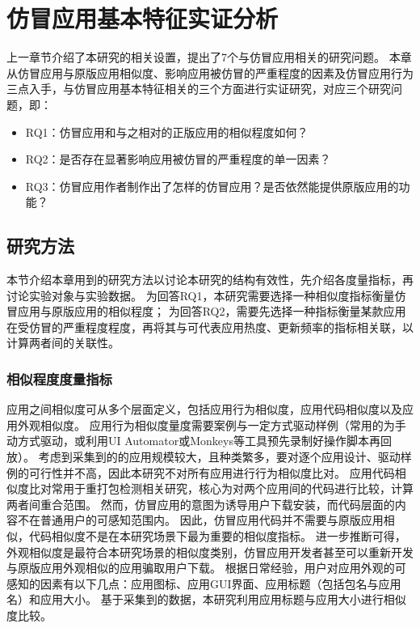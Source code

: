 \chapter{仿冒应用基本特征实证分析}
\label{chp:discoveries_basic}

上一章节介绍了本研究的相关设置，提出了7个与仿冒应用相关的研究问题。
本章从仿冒应用与原版应用相似度、影响应用被仿冒的严重程度的因素及仿冒应用行为三点入手，与仿冒应用基本特征相关的三个方面进行实证研究，对应三个研究问题，即：

\begin{itemize}
    \item RQ1：仿冒应用和与之相对的正版应用的相似程度如何？
    \item RQ2：是否存在显著影响应用被仿冒的严重程度的单一因素？
    \item RQ3：仿冒应用作者制作出了怎样的仿冒应用？是否依然能提供原版应用的功能？
\end{itemize}

\section{研究方法}
\label{sec:measure_selection}

本节介绍本章用到的研究方法以讨论本研究的结构有效性，先介绍各度量指标，再讨论实验对象与实验数据。
为回答RQ1，本研究需要选择一种相似度指标衡量仿冒应用与原版应用的相似程度；
为回答RQ2，需要先选择一种指标衡量某款应用在受仿冒的严重程度程度，再将其与可代表应用热度、更新频率的指标相关联，以计算两者间的关联性。

\subsection{相似程度度量指标}

应用之间相似度可从多个层面定义，包括应用行为相似度，应用代码相似度以及应用外观相似度。
应用行为相似度量度需要案例与一定方式驱动样例（常用的为手动方式驱动，或利用UI Automator或Monkeys等工具预先录制好操作脚本再回放）。
考虑到采集到的的应用规模较大，且种类繁多，要对逐个应用设计、驱动样例的可行性并不高，因此本研究不对所有应用进行行为相似度比对。
应用代码相似度比对常用于重打包检测相关研究，核心为对两个应用间的代码进行比较，计算两者间重合范围。
然而，仿冒应用的意图为诱导用户下载安装，而代码层面的内容不在普通用户的可感知范围内。
因此，仿冒应用代码并不需要与原版应用相似，代码相似度不是在本研究场景下最为重要的相似度指标。
进一步推断可得，外观相似度是最符合本研究场景的相似度类别，仿冒应用开发者甚至可以重新开发与原版应用外观相似的应用骗取用户下载。
根据日常经验，用户对应用外观的可感知的因素有以下几点：应用图标、应用GUI界面、应用标题（包括包名与应用名）和应用大小。
基于采集到的数据，本研究利用应用标题与应用大小进行相似度比较。

